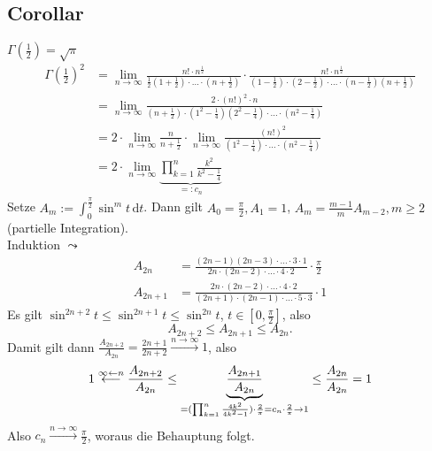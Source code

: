 \subsection[Corollar: $\Gamma(1/2) = \sqrt{\pi}$]{Corollar} %
\label{sub:79}
$\Gamma(\frac{1}{2} ) = \sqrt{\pi }  $
\begin{align*}
	\Gamma(\frac{1}{2} )^2 &= \lim_{ n \to \infty} \frac{n! \cdot n^{\frac{1}{2} }}{\frac{1}{2}(1+ \frac{1}{2} ) \cdot \ldots \cdot (n+ \frac{1}{2} ) } \cdot 
	\frac{n! \cdot n^{\frac{1}{2}} }{(1-\frac{1}{2} ) \cdot (2-\frac{1}{2} ) \cdot \ldots \cdot (n- \frac{1}{2} ) (n+\frac{1}{2} )}  \\
	&= \lim_{ n \to \infty} \frac{2 \cdot  (n!)^2 \cdot n}{(n+\frac{1}{2} ) \cdot (1^2- \frac{1}{4} ) (2^2 - \frac{1}{4} ) \cdot \ldots \cdot (n^2- \frac{1}{4} )} \\
	&= 2 \cdot \lim_{ n \to \infty}  \frac{n}{n+\frac{1}{2} } \cdot \lim_{ n \to \infty} \frac{(n!)^2}{(1^2 - \frac{1}{4} ) \cdot \ldots \cdot (n^2- \frac{1}{4} )} \\
	&= 2 \cdot \lim_{ n \to \infty} \underbrace{\prod_{k=1}^{n} \frac{k^2}{k^2- \frac{1}{4} } }_{=: c_n}
\end{align*}
Setze $A_m := \int_{0} ^{\frac{\pi }{2} } \! \sin^m t  \, \mathrm{d}t$. Dann gilt $A_0 = \frac{\pi }{2}, A_1 =1 $, $A_m = \frac{m-1}{m} A_{m-2}, m \ge 2 $ 
(partielle Integration). \\
Induktion $\leadsto$
\begin{align*}
	A_{2n} &= \frac{(2n-1) (2n-3) \cdot \ldots \cdot 3 \cdot 1}{2n \cdot (2n-2) \cdot \ldots \cdot 4 \cdot 2} \cdot \frac{\pi}{2} \\
	A_{2n+1} &= \frac{2n \cdot (2n-2) \cdot \ldots \cdot 4 \cdot 2}{(2n+1) \cdot (2n-1) \cdot \ldots \cdot 5 \cdot 3} \cdot 1 
\end{align*}
Es gilt $\sin^{2n+2}t \le \sin^{2n+1} t \le \sin^{2n} t $, $t \in [0, \frac{\pi}{2}]$, also
\[
	A_{2n+2} \le A_{2n+1} \le A_{2n}.
\]
Damit gilt dann $\frac{A_{2n+2}}{A_{2n}} = \frac{2n+1}{2n+2} \xrightarrow{n \to \infty} 1  $, also
\begin{align*}
	1\overset{\infty \leftarrow n}{\longleftarrow} \frac{A_{2n+2}}{A_{2n}} \le \underbrace{\frac{A_{2n+1}}{A_{2n}}}_{= (\prod_{k=1}^n \frac{4k^2}{4k^2-1}) \cdot \frac{2}{\pi} = c_n \cdot \frac{2}{\pi} \to 1  } \le \frac{A_{2n}}{A_{2n}} = 1  
\end{align*}
Also $c_n \xrightarrow{n \to \infty} \frac{\pi }{2} $, woraus die Behauptung folgt. \bewende

